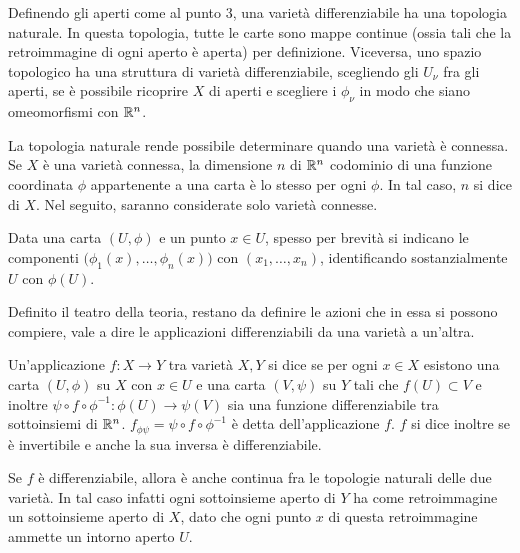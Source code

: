 \begin{remark}
  Definendo gli aperti come al punto $3$, una varietà differenziabile ha una topologia naturale. In questa topologia, tutte le carte sono mappe continue (ossia tali che la retroimmagine di ogni aperto è aperta) per definizione. Viceversa, uno spazio topologico ha una struttura di varietà differenziabile, scegliendo gli $U_{\nu}$ fra gli aperti, se è possibile ricoprire $X$ di aperti e scegliere i $\phi_{\nu}$ in modo che siano omeomorfismi con $\mathbb{R}^{n}$.
\end{remark}
\begin{remark}
  La topologia naturale rende possibile determinare quando una varietà è connessa. Se $X$ è una varietà connessa, la dimensione $n$ di $\mathbb{R}^{n}$ codominio di una funzione coordinata $\phi$ appartenente a una carta è lo stesso per ogni $\phi$. In tal caso, $n$ si dice  di $X$. Nel seguito, saranno considerate solo varietà connesse.
\end{remark} 

Data una carta $(U,\phi)$ e un punto $x \in U$, spesso per brevità si indicano le componenti $\big(\phi_1(x), \ldots, \phi_{n}(x)\big)$ con $(x_1, \ldots, x_n)$, identificando sostanzialmente $U$ con $\phi(U)$. 

Definito il teatro della teoria, restano da definire le azioni che in essa si possono compiere, vale a dire le applicazioni differenziabili da una varietà a un'altra.
\begin{definition}
  Un'applicazione $f:X \to Y$ tra varietà $X, Y$ si dice  se per ogni $x \in  X$ esistono una carta $(U, \phi)$ su $X$ con $x \in U$ e una carta $(V, \psi)$ su $Y$ tali che $f(U) \subset V$ e inoltre $\psi \circ f \circ \phi^{-1}: \phi(U) \to \psi(V)$ sia una funzione differenziabile tra sottoinsiemi di $\mathbb{R}^{n}$. $f_{\phi \psi} = \psi \circ f \circ \phi^{-1}$ è detta  dell'applicazione $f$. $f$ si dice inoltre  se è invertibile e anche la sua inversa è differenziabile. 
\end{definition}
\begin{remark}
  Se $f$ è differenziabile, allora è anche continua fra le topologie naturali delle due varietà. In tal caso infatti ogni sottoinsieme aperto di $Y$ ha come retroimmagine un sottoinsieme aperto di $X$, dato che ogni punto $x$ di questa retroimmagine ammette un intorno aperto $U$.
\end{remark}

